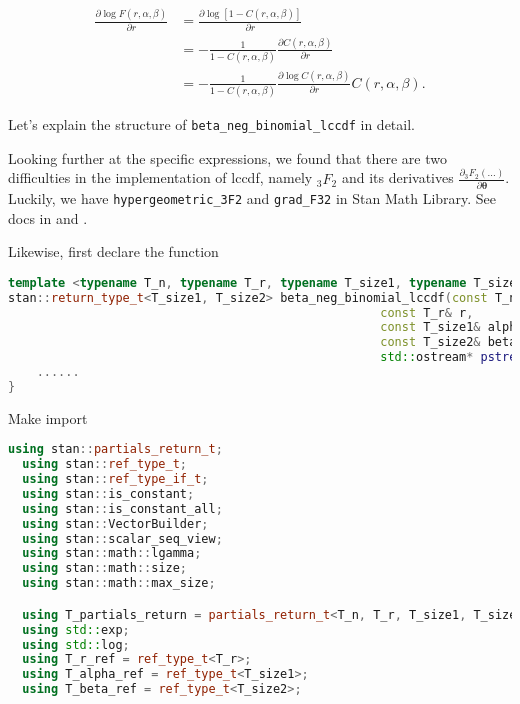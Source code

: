 \documentclass[11pt]{article}
\begin{document}
\begin{equation}
\begin{aligned}
	\frac{\partial \log F(r,\alpha,\beta)}{\partial r} &= \frac{\partial \log [1 - C(r,\alpha,\beta)]}{\partial r}\\
	 &= - \frac{1}{1 - C(r,\alpha,\beta)} \frac{\partial C(r,\alpha,\beta)}{\partial r} \\
	 &= - \frac{1}{1 - C(r,\alpha,\beta)} \frac{\partial \log C(r,\alpha,\beta)}{\partial r} C(r,\alpha,\beta).
\end{aligned}
\end{equation}

Let’s explain the structure of \verb|beta_neg_binomial_lccdf| in detail.

Looking further at the specific expressions, we found that there are two difficulties in the implementation of lccdf, namely ${}_3F_2$ and its derivatives $\frac{\partial {}_3F_2(...)}{\partial \boldsymbol{\theta}}$. Luckily, we have \verb|hypergeometric_3F2| and \verb|grad_F32| in Stan Math Library. See docs in  and .

\begin{comment}


\end{comment}



Likewise, first declare the function
\begin{lstlisting}[language=c++, style=lgeneral]
template <typename T_n, typename T_r, typename T_size1, typename T_size2>
stan::return_type_t<T_size1, T_size2> beta_neg_binomial_lccdf(const T_n& n, 
                                                    const T_r& r,
                                                    const T_size1& alpha,
                                                    const T_size2& beta,
                                                    std::ostream* pstream__) {
	......
}
\end{lstlisting}

Make import
\begin{lstlisting}[language=c++, style=lgeneral]
  using stan::partials_return_t;
  using stan::ref_type_t;
  using stan::ref_type_if_t;
  using stan::is_constant;
  using stan::is_constant_all;
  using stan::VectorBuilder;
  using stan::scalar_seq_view;
  using stan::math::lgamma;
  using stan::math::size;
  using stan::math::max_size;

  using T_partials_return = partials_return_t<T_n, T_r, T_size1, T_size2>;
  using std::exp;
  using std::log;
  using T_r_ref = ref_type_t<T_r>;
  using T_alpha_ref = ref_type_t<T_size1>;
  using T_beta_ref = ref_type_t<T_size2>;
\end{lstlisting}
\end{document}
